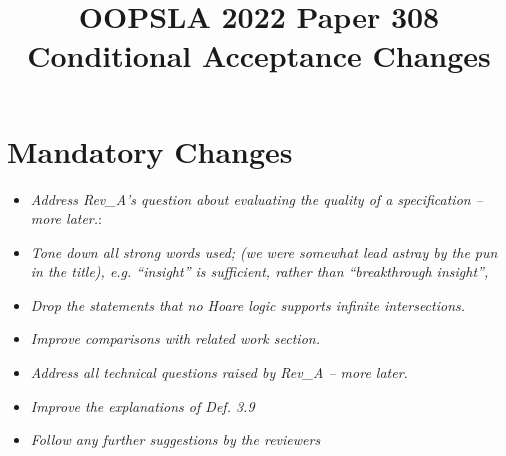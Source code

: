 \documentclass[11pt]{amsart}
\title{OOPSLA 2022 Paper 308 Conditional Acceptance Changes}
\begin{document}
\maketitle

\section{Mandatory Changes}

\begin{itemize}
\item
\emph{Address Rev\_A’s question about evaluating the quality of a specification -- more later.}:
\item
\emph{Tone down all strong words used; (we were somewhat lead astray by the pun in the title), e.g. “insight” is sufficient, rather than “breakthrough insight”,}
\item
\emph{Drop the statements that no Hoare logic supports infinite intersections.}
\item
\emph{Improve comparisons with related work section.}
\item
\emph{Address all technical questions raised by Rev\_A -- more later.}
\item
\emph{Improve the explanations of Def. 3.9}
\item
\emph{Follow any further suggestions by the reviewers}
\end{itemize}




 
\end{document}
